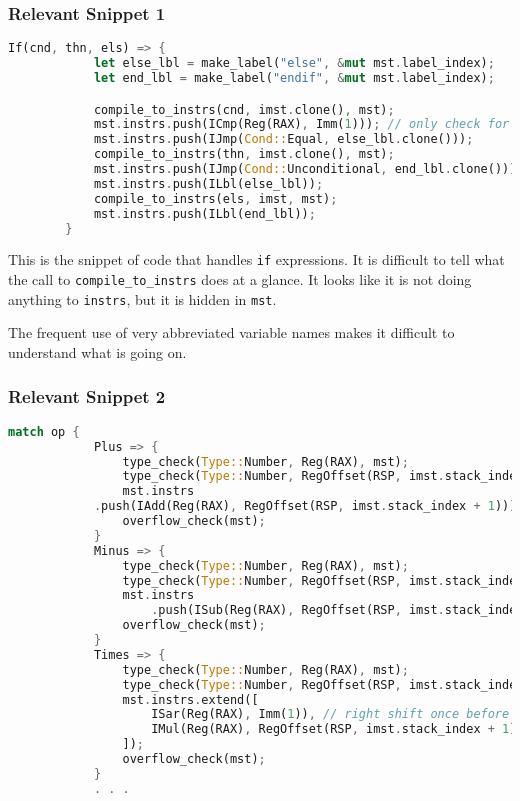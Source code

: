 	\pagebreak
	\subsubsection{Relevant Snippet 1}

	\begin{lstlisting}[language=Rust, title=from \texttt{src/main.rs}]
		If(cnd, thn, els) => {
		    let else_lbl = make_label("else", &mut mst.label_index);
		    let end_lbl = make_label("endif", &mut mst.label_index);

		    compile_to_instrs(cnd, imst.clone(), mst);
		    mst.instrs.push(ICmp(Reg(RAX), Imm(1))); // only check for false
		    mst.instrs.push(IJmp(Cond::Equal, else_lbl.clone()));
		    compile_to_instrs(thn, imst.clone(), mst);
		    mst.instrs.push(IJmp(Cond::Unconditional, end_lbl.clone())); // jump to end after then
		    mst.instrs.push(ILbl(else_lbl));
		    compile_to_instrs(els, imst, mst);
		    mst.instrs.push(ILbl(end_lbl));
		}
	\end{lstlisting}

	This is the snippet of code that handles \verb|if| expressions. It is difficult to tell what the call to \verb|compile_to_instrs| does at a glance. It looks like it is not doing anything to \verb|instrs|, but it is hidden in \verb|mst|.

	The frequent use of very abbreviated variable names makes it difficult to understand what is going on.

	\pagebreak
	\subsubsection{Relevant Snippet 2}

	\begin{lstlisting}[language=Rust, title=from \texttt{src/main.rs}]
		match op {
		    Plus => {
		        type_check(Type::Number, Reg(RAX), mst);
		        type_check(Type::Number, RegOffset(RSP, imst.stack_index + 1), mst);
		        mst.instrs
			.push(IAdd(Reg(RAX), RegOffset(RSP, imst.stack_index + 1)));
		        overflow_check(mst);
		    }
		    Minus => {
		        type_check(Type::Number, Reg(RAX), mst);
		        type_check(Type::Number, RegOffset(RSP, imst.stack_index + 1), mst);
		        mst.instrs
		            .push(ISub(Reg(RAX), RegOffset(RSP, imst.stack_index + 1)));
		        overflow_check(mst);
		    }
		    Times => {
		        type_check(Type::Number, Reg(RAX), mst);
		        type_check(Type::Number, RegOffset(RSP, imst.stack_index + 1), mst);
		        mst.instrs.extend([
		            ISar(Reg(RAX), Imm(1)), // right shift once before multiplying
		            IMul(Reg(RAX), RegOffset(RSP, imst.stack_index + 1)),
		        ]);
		        overflow_check(mst);
		    }
		    . . .
	\end{lstlisting}

